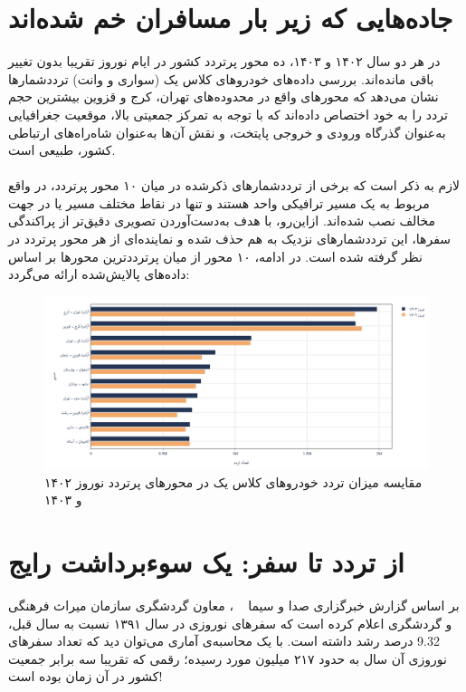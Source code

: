 \documentclass[a4paper, 12pt]{article}
\begin{document}
\section{جاده‌هایی که زیر بار مسافران خم شده‌اند}
در هر دو سال ۱۴۰۲ و ۱۴۰۳، ده محور پرتردد کشور در ایام نوروز تقریبا بدون تغییر باقی مانده‌اند. بررسی داده‌های خودروهای کلاس یک (سواری و وانت) ترددشمارها نشان می‌دهد که محورهای واقع در محدوده‌های تهران، کرج و قزوین بیشترین حجم تردد را به خود اختصاص داده‌اند که با توجه به تمرکز جمعیتی بالا، موقعیت جغرافیایی به‌عنوان گذرگاه ورودی و خروجی پایتخت، و نقش آن‌ها به‌عنوان شاه‌راه‌های ارتباطی کشور، طبیعی است.
\\
\\
لازم به ذکر است که برخی از ترددشمارهای ذکرشده در میان ۱۰ محور پرتردد، در واقع مربوط به یک مسیر ترافیکی واحد هستند و تنها در نقاط مختلف مسیر یا در جهت مخالف نصب شده‌اند. ازاین‌رو، با هدف به‌دست‌آوردن تصویری دقیق‌تر از پراکندگی سفرها، این ترددشمارهای نزدیک به هم حذف شده و نماینده‌ای از هر محور پرتردد در نظر گرفته شده است. در ادامه، ۱۰ محور از میان پرترددترین محورها بر اساس داده‌های پالایش‌شده ارائه می‌گردد:
\begin{figure}[htbp]
    \centering
    \includegraphics[width=1\textwidth]{pics/busy-roads/most_taradod_roads.png}
    \caption{مقایسه میزان تردد خودروهای کلاس یک در محورهای پرتردد نوروز ۱۴۰۲ و ۱۴۰۳}
\end{figure}

\newpage
\section{از تردد تا سفر: یک سوء‌برداشت رایج}
بر اساس گزارش خبرگزاری صدا و سیما
~\cite{irib}
، معاون گردشگری سازمان میراث فرهنگی و گردشگری اعلام کرده است که سفرهای نوروزی در سال ۱۳۹۱ نسبت به سال قبل،
9.32
درصد رشد داشته است. با یک محاسبه‌ی آماری می‌توان دید که تعداد سفرهای نوروزی آن سال به حدود ۲۱۷ میلیون مورد رسیده؛ رقمی که تقریبا سه برابر جمعیت کشور در آن زمان بوده است!
~\cite{mashregh, khorasan}
\\
\end{document}
